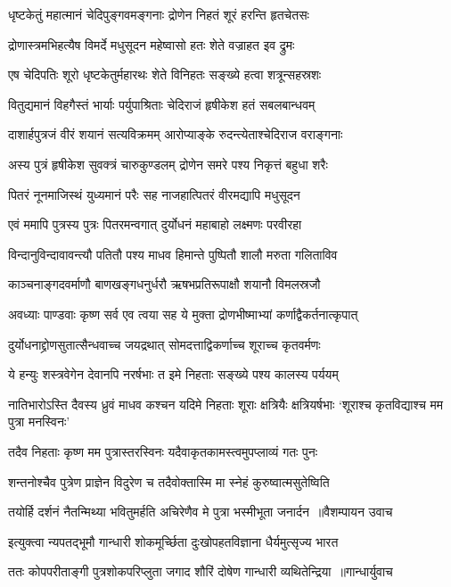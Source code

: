 \twolineshloka
{धृष्टकेतुं महात्मानं चेदिपुङ्गवमङ्गनाः}
{द्रोणेन निहतं शूरं हरन्ति हृतचेतसः}


\twolineshloka
{द्रोणास्त्रमभिहत्यैष विमर्दे मधुसूदन}
{महेष्वासो हतः शेते वज्राहत इव द्रुमः}


\twolineshloka
{एष चेदिपतिः शूरो धृष्टकेतुर्महारथः}
{शेते विनिहतः सङ्ख्ये हत्वा शत्रून्सहस्रशः}


\twolineshloka
{वितुद्यमानं विहगैस्तं भार्याः पर्युपाश्रिताः}
{चेदिराजं हृषीकेश हतं सबलबान्धवम्}


\twolineshloka
{दाशार्हपुत्रजं वीरं शयानं सत्यविक्रमम्}
{आरोप्याङ्के रुदन्त्येताश्चेदिराज वराङ्गनाः}


\twolineshloka
{अस्य पुत्रं हृषीकेश सुवक्त्रं चारुकुण्डलम्}
{द्रोणेन समरे पश्य निकृत्तं बहुधा शरैः}


\twolineshloka
{पितरं नूनमाजिस्थं युध्यमानं परैः सह}
{नाजहात्पितरं वीरमद्यापि मधुसूदन}


\twolineshloka
{एवं ममापि पुत्रस्य पुत्रः पितरमन्वगात्}
{दुर्योधनं महाबाहो लक्ष्मणः परवीरहा}


\twolineshloka
{विन्दानुविन्दावावन्त्यौ पतितौ पश्य माधव}
{हिमान्ते पुष्पितौ शालौ मरुता गलिताविव}


\twolineshloka
{काञ्चनाङ्गदवर्माणौ बाणखङ्गधनुर्धरौ}
{ऋषभप्रतिरूपाक्षौ शयानौ विमलस्रजौ}


\twolineshloka
{अवध्याः पाण्डवाः कृष्ण सर्व एव त्वया सह}
{ये मुक्ता द्रोणभीष्माभ्यां कर्णाद्वैकर्तनात्कृपात्}


\twolineshloka
{दुर्योधनाद्द्रोणसुतात्सैन्धवाच्च जयद्रथात्}
{सोमदत्ताद्विकर्णाच्च शूराच्च कृतवर्मणः}


\twolineshloka
{ये हन्युः शस्त्रवेगेन देवानपि नरर्षभाः}
{त इमे निहताः सङ्ख्ये पश्य कालस्य पर्ययम्}


\threelineshloka
{नातिभारोऽस्ति दैवस्य ध्रुवं माधव कश्चन}
{यदिमे निहताः शूराः क्षत्रियैः क्षत्रियर्षभाः}
{`शूराश्च कृतविद्याश्च मम पुत्रा मनस्विनः'}


\twolineshloka
{तदैव निहताः कृष्ण मम पुत्रास्तरस्विनः}
{यदैवाकृतकामस्त्वमुपप्लाव्यं गतः पुनः}


\twolineshloka
{शन्तनोश्चैव पुत्रेण प्राज्ञेन विदुरेण च}
{तदैवोक्तास्मि मा स्नेहं कुरुष्वात्मसुतेष्विति}


\threelineshloka
{तयोर्हि दर्शनं नैतन्मिथ्या भवितुमर्हति}
{अचिरेणैव मे पुत्रा भस्मीभूता जनार्दन ॥वैशम्पायन उवाच}
{}


\twolineshloka
{इत्युक्त्वा न्यपतद्भूमौ गान्धारी शोकमूर्च्छिता}
{दुःखोपहतविज्ञाना धैर्यमुत्सृज्य भारत}


\threelineshloka
{ततः कोपपरीताङ्गी पुत्रशोकपरिप्लुता}
{जगाद शौरिं दोषेण गान्धारी व्यथितेन्द्रिया ॥गान्धार्युवाच}
{}


